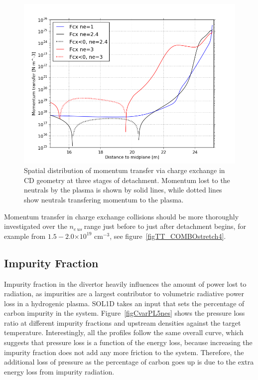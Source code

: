 \documentclass[12pt]{article}  %
\providecommand{\e}[1]{\ensuremath{\times 10^{#1}}} %
\providecommand{\pow}[1]{{$^{#1}$}} %
\providecommand{\neus}{$n_{e~us}~$} %
\begin{document}
\begin{figure}
\includegraphics[scale=0.5]{Figures/sol1d/balFcx16m.png}
\centering
\caption{Spatial distribution of momentum transfer via charge exchange in CD geometry at three stages of detachment. Momentum lost to the neutrals by the plasma is shown by solid lines, while dotted lines show neutrals transfering momentum to the plasma.}\label{figbalFcx16m}
\end{figure}

Momentum transfer in charge exchange collisions should be more thoroughly investigated over the \neus range just before to just after detachment begins, for example from $1.5 - 2.0\e{19}$ cm\pow{-3}, see figure~\ref{figTT_COMBOstretch4}.



\subsection{Impurity Fraction}\label{ssecImpfrac}
Impurity fraction in the divertor heavily influences the amount of power lost to radiation, as impurities are a largest contributor to volumetric radiative power loss in a hydrogenic plasma. SOL1D takes an input that sets the percentage of carbon impurity in the system. Figure~\ref{figCvarPL5nes} shows the pressure loss ratio at different impurity fractions and upstream densities against the target temperature. Interestingly, all the profiles follow the same overall curve, which suggests that pressure loss is a function of the energy loss, because increasing the impurity fraction does not add any more friction to the system. Therefore, the additional loss of pressure as the percentage of carbon goes up is due to the extra energy loss from impurity radiation.
\end{document}
